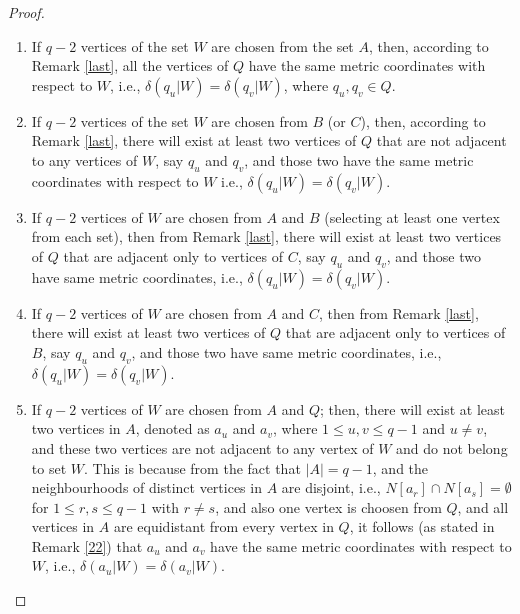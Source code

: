 \documentclass[10pt,a4paper]{amsart}
\begin{document}
\begin{proof}
\begin{enumerate}
\item If $q-2$ vertices of the set $W$ are chosen from the set $A$, then, according to Remark \ref{last}, all the vertices of $Q$ have the same metric coordinates with respect to $W$, i.e., $\delta(q_{u}|W) =\delta(q_{v}|W)$, where $q_{u},q_{v} \in Q.$
\item If $q-2$ vertices of the set $W$ are chosen from $B$ (or $C$), then, according to Remark \ref{last}, there will exist at least two vertices of $Q$ that are not adjacent to any vertices of $W$, say $q_{u}$ and $q_{v}$, and those two have the same metric coordinates with respect to $W$ i.e., $\delta(q_{u}|W) =\delta(q_{v}|W)$.
\item If $q-2$ vertices of $W$ are chosen from  $A$ and $B$ (selecting at least one vertex from each set), then
from Remark \ref{last}, there will exist at least two vertices of $Q$ that are adjacent only to vertices of $C$, say $q_{u}$ and $q_{v}$, and those two have same metric coordinates, i.e., $\delta(q_{u}|W) =\delta(q_{v}|W)$.
\item If $q-2$ vertices of $W$ are chosen from $A$ and $C$, then
from Remark \ref{last}, there will exist at least two vertices of $Q$ that are adjacent only to vertices of $B$, say $q_{u}$ and $q_{v}$, and those two have same metric coordinates, i.e., $\delta(q_{u}|W) =\delta(q_{v}|W)$.
\item  \label{item1} If $q-2$ vertices of $W$ are chosen from \( A \) and \( Q \); then, there will exist at least two vertices in \( A \), denoted as \( a_u \) and \( a_v \), where \( 1 \leq u, v\leq q-1\) and \(u\neq v \), and these two vertices are not adjacent to any vertex of  \( W \) and do not belong to set \( W \). This is because from the fact that \( |A| = q-1 \), and the neighbourhoods of distinct vertices in \( A \) are disjoint, i.e., \( N[a_r] \cap N[a_s] = \emptyset \) for \( 1 \leq r, s \leq q-1 \) with \( r \neq s \), and also one vertex is choosen from \( Q \), and all vertices in \( A \) are equidistant from every vertex in \( Q \), it follows (as stated in Remark \ref{22}) that  \( a_u \) and \( a_v \) have the same metric coordinates with respect to \( W \), i.e., $\delta(a_u | W) = \delta(a_v | W)$.

\end{enumerate}
\end{proof}
\end{document}
